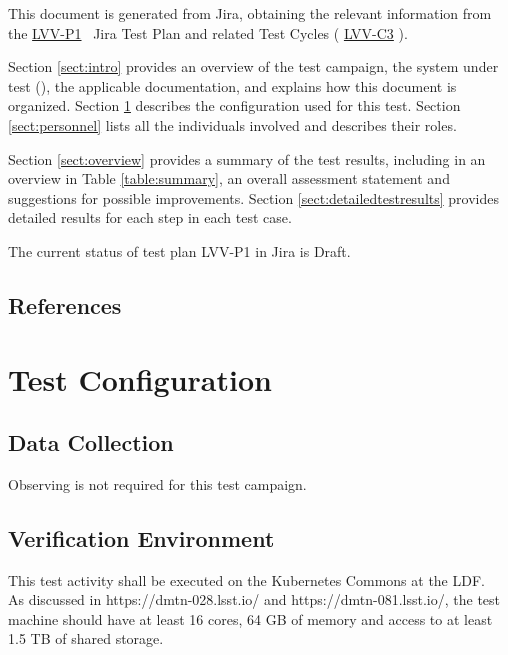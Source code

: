 \documentclass[DM,lsstdraft,STR,toc]{lsstdoc}
\begin{document}
This document is generated from Jira, obtaining the relevant information from the 
\href{https://jira.lsstcorp.org/secure/Tests.jspa#/testPlan/LVV-P1}{LVV-P1}
~Jira Test Plan and related Test Cycles (
  \href{https://jira.lsstcorp.org/secure/Tests.jspa#/testCycle/LVV-C3}{LVV-C3}
).


Section \ref{sect:intro} provides an overview of the test campaign, the system under test (\product{}), the applicable documentation, and explains how this document is organized.
Section \ref{sect:configuration}  describes the configuration used for this test.
Section \ref{sect:personnel} lists all the individuals involved and describes their roles.

Section \ref{sect:overview} provides a summary of the test results, including in an overview in Table \ref{table:summary}, an overall assessment statement and suggestions for possible improvements.
Section \ref{sect:detailedtestresults} provides detailed results for each step in each test case.

The current status of test plan LVV-P1 in Jira is Draft.

\subsection{References}
\label{sect:references}
\renewcommand{\refname}{}

\section{Test Configuration}
\label{sect:configuration}

\subsection{Data Collection}

  Observing is not required for this test campaign.

\subsection{Verification Environment}
\label{sect:hwconf}
  This test activity shall be executed on the Kubernetes Commons at the
LDF.\\
As discussed in https://dmtn-028.lsst.io/ and https://dmtn-081.lsst.io/,
the test machine should have at least 16 cores, 64 GB of memory and
access to at least 1.5 TB of shared storage.
\end{document}
